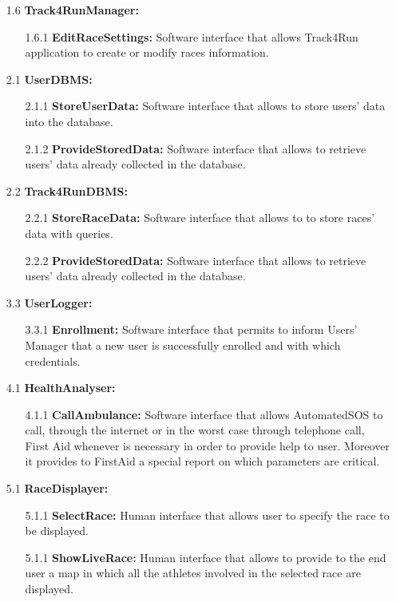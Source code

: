 \begin{enumerate}
\item[1.6] \textbf{Track4RunManager: }
	\begin{enumerate}
		\item[1.6.1] \textbf{EditRaceSettings:} Software interface that allows Track4Run application to create or modify races information.
	\end{enumerate}

\item[2.1] \textbf{UserDBMS: }
	\begin{enumerate}
		\item[2.1.1] \textbf{StoreUserData:} Software interface that allows to store users' data into the database.
		\item[2.1.2] \textbf{ProvideStoredData:} Software interface that allows to retrieve users' data already collected in the database.
	\end{enumerate}
	
\item[2.2] \textbf{Track4RunDBMS: }
	\begin{enumerate}
		\item[2.2.1] \textbf{StoreRaceData:} Software interface that allows to to store races' data with queries.
		\item[2.2.2] \textbf{ProvideStoredData:} Software interface that allows to retrieve users' data already collected in the database.
	\end{enumerate}
	
\item[3.3] \textbf{UserLogger: }
	\begin{enumerate}
		\item[3.3.1] \textbf{Enrollment:} Software interface that permits to inform Users' Manager that a new user is successfully enrolled and with which credentials.
	\end{enumerate}
	
\item[4.1] \textbf{HealthAnalyser: }
	\begin{enumerate}
		\item[4.1.1] \textbf{CallAmbulance:} Software interface that allows AutomatedSOS to call, through the internet or in the worst case through telephone call, First Aid whenever is necessary in order to provide help to user. Moreover it provides to FirstAid a special report on which parameters are critical.
	\end{enumerate}
	
\item[5.1] \textbf{RaceDisplayer: }
	\begin{enumerate}
		\item[5.1.1] \textbf{SelectRace:} Human interface that allows user to specify the race to be displayed.
		\item[5.1.1] \textbf{ShowLiveRace:}  Human interface that allows to provide to the end user a map in which all the athletes involved in the selected race are displayed.
	\end{enumerate}	


\end{enumerate}
